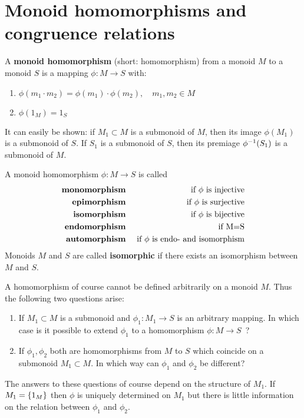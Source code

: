\section{Monoid homomorphisms and congruence relations}

\begin{definition}
A {\bf monoid homomorphism} (short: homomorphism) from a monoid $M$ to a monoid
$S$ is a mapping $\phi : M \to S$ with:
\begin{enumerate}
  \item $\phi(m_1 \cdot m_2) = \phi(m_1) \cdot \phi(m_2), \quad m_1, m_2 \in M$
  \item $\phi(1_M) = 1_S$
\end{enumerate}
\end{definition}

It can easily be shown: if $M_1 \subset M$ is a submonoid of $M$, then its image 
$\phi(M_1)$ is a submonoid of $S$. If $S_1$ is a submonoid of $S$, then its
premiage $\mbox{${\phi}^{-1}$}(S_1)$ is a submonoid of $M$.

A monoid homomorphism $\phi: M \to S$ is called
\begin{eqnarray*}
\text{\bf monomorphism} & & \text{ if $\phi$ is injective} \\
\text{\bf epimorphism} & & \text{ if $\phi$ is surjective} \\
\text{\bf isomorphism} & & \text{ if $\phi$ is bijective} \\
\text{\bf endomorphism} & & \text{ if M=S} \\
\text{\bf automorphism} & & \text{ if $\phi$ is endo- and isomorphism}
\end{eqnarray*}
Monoids $M$ and $S$ are called {\bf isomorphic} if there exists an
isomorphism between $M$ and $S$.

A homomorphism of course cannot be defined arbitrarily on a monoid $M$.
Thus the following two questions arise:
\begin{enumerate}
  \item If $M_1 \subset M$ is a submonoid and $\phi_1 : M_1 \to S$ is an
  arbitrary mapping. In which case is it possible to extend $\phi_1$ to a homomorphism $\phi
: M \to S$\ ?
	\item If $\phi_1, \phi_2$ both are homomorphisms from $M$ to $S$ which
	coincide on a submonoid $M_1 \subset M$. In which way can $\phi_1$ and $\phi_2$
	be different? 
\end{enumerate}

The answers to these questions of course depend on the structure of $M_1$. If
$M_1 = \mbox{$\{1_M\}$}$ then $\phi$ is uniquely determined on $M_1$ but there is
little information on the relation between $\phi_1$ and $\phi_2$.

